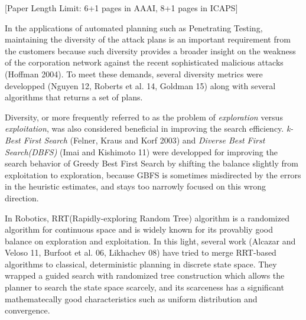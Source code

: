 
\begin{abstract}
Maintaining the diversity in the results of heuristic search has been an
important requirement in the applications of automated planning such as
Penetrating Testing.
Despite the common-sense notion of diversity that it provides a new
perspective and better understanding of the world, little has been investigated on the
benefit of diversity when applied to the admissible search algorithms in terms of search efficiency.
In this paper, we propose a novel 
diversified tie-breaking method for A* 
which tries to expand the dissimilar branches as much as possible,
maintaining the admissibility of the search.
\end{abstract}

[Paper Length Limit: 6+1 pages in AAAI, 8+1 pages in ICAPS]

In the applications of automated planning such as Penetrating Testing,
maintaining the diversity of the attack plans is an important requirement from the customers because
such diversity provides a broader insight on
the weakness of the corporation network against 
the recent sophisticated malicious attacks (Hoffman 2004).
To meet these demands, several diversity metrics were developped (Nguyen
12, Roberts et al. 14, Goldman 15) along with several algorithms that
returns a set of plans.

Diversity, or more frequently referred to as the problem of \emph{exploration} versus
\emph{exploitation}, was also considered beneficial in improving the search efficiency.
\emph{k-Best First Search} (Felner, Kraus
and Korf 2003) and \emph{Diverse Best First Search(DBFS)}
(Imai and Kishimoto 11) were developped for
improving the search behavior of Greedy Best First Search by shifting the
balance slightly from exploitation to exploration, because GBFS
is sometimes misdirected by the errors in the heuristic estimates,
and stays too narrowly focused on this wrong direction.

In Robotics, RRT(Rapidly-exploring Random Tree) algorithm is a randomized
algorithm for continuous space and is
widely known for its provabliy good balance on exploration and exploitation.
In this light, several work (Alcazar and
Veloso 11, Burfoot et al. 06, Likhachev 08) have tried to merge
RRT-based algorithms to classical, deterministic planning in discrete state space.
They wrapped a guided search with randomized tree construction which allows the
planner to search the state space scarcely, and its scarceness has a
significant mathematecally good characteristics such as uniform
distribution and convergence.


